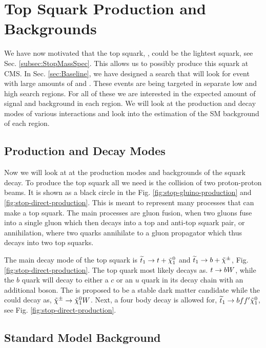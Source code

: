 \chapter{Top Squark Production and Backgrounds}
\label{ch:Search}

We have now motivated that the top squark, \st{}, could be the lightest squark, see Sec. \ref{subsec:StopMassSpec}. This allows us to possibly produce this squark at CMS. In Sec. \ref{sec:Baseline}, we have designed a search that will look for event with large amounts of \met{} and \nj. These events are being targeted in separate low \dm{} and high \dm{} search regions. For all of these we are interested in the expected amount of signal and background in each region. We will look at the production and decay modes of various \st{} interactions and look into the estimation of the SM background of each region. 

\section{Production and Decay Modes}
\label{sec:Production}

Now we will look at at the production modes and backgrounds of the \st{} squark decay. To produce the top squark all we need is the collision of two proton-proton beams. It is shown as a black circle in the Fig. \ref{fig:stop-gluino-production} and \ref{fig:stop-direct-production}. This is meant to represent many processes that can make a top squark. The main processes are gluon fusion, when two gluons fuse into a single gluon which then decays into a top and anti-top squark pair, or annihilation, where two quarks annihilate to a gluon propagator which thus decays into two top squarks. 



The main decay mode of the top squark is $\widetilde{t}_1\rightarrow t+\tilde{\chi}^{0}_{1}$ and $\widetilde{t}_1\rightarrow b+\tilde{\chi}^{\pm}$, Fig. \ref{fig:stop-direct-production}. The top quark most likely decays as. $t\rightarrow bW$, while the $b$ quark will decay to either a $c$ or an $u$ quark in its decay chain with an additional \W{} boson. The \neutralino{} is proposed to be a stable dark matter candidate while the \chargino could decay as, $\tilde{\chi}^{\pm}\rightarrow\tilde{\chi}^{0}_{1}W$. Next, a four body decay is allowed for, $\widetilde{t}_1\rightarrow b f f^\prime \tilde{\chi}^{0}_{1}$, see Fig. \ref{fig:stop-direct-production}.

\section{Standard Model Background}
\label{sec:SMBackground}

